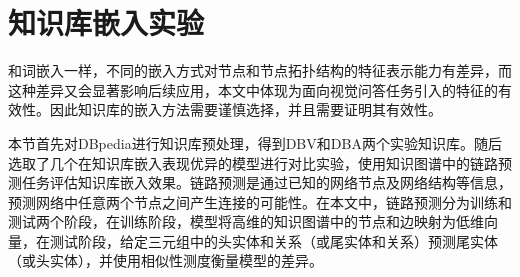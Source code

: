 


\section{知识库嵌入实验}
和词嵌入一样，不同的嵌入方式对节点和节点拓扑结构的特征表示能力有差异，而这种差异又会显著影响后续应用，本文中体现为面向视觉问答任务引入的特征的有效性。因此知识库的嵌入方法需要谨慎选择，并且需要证明其有效性。

本节首先对DBpedia进行知识库预处理，得到DBV和DBA两个实验知识库。随后选取了几个在知识库嵌入表现优异的模型进行对比实验，使用知识图谱中的链路预测任务评估知识库嵌入效果。链路预测是通过已知的网络节点及网络结构等信息，预测网络中任意两个节点之间产生连接的可能性。在本文中，链路预测分为训练和测试两个阶段，在训练阶段，模型将高维的知识图谱中的节点和边映射为低维向量，在测试阶段，给定三元组中的头实体和关系（或尾实体和关系）预测尾实体（或头实体），并使用相似性测度衡量模型的差异。

